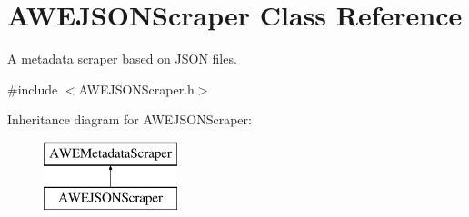\hypertarget{class_a_w_e_j_s_o_n_scraper}{\section{A\-W\-E\-J\-S\-O\-N\-Scraper Class Reference}
\label{class_a_w_e_j_s_o_n_scraper}
}


A metadata scraper based on J\-S\-O\-N files.  




{\ttfamily \#include $<$A\-W\-E\-J\-S\-O\-N\-Scraper.\-h$>$}

Inheritance diagram for A\-W\-E\-J\-S\-O\-N\-Scraper\-:\begin{figure}[H]
\begin{center}
\leavevmode
\includegraphics[height=2.000000cm]{class_a_w_e_j_s_o_n_scraper}
\end{center}
\end{figure}

